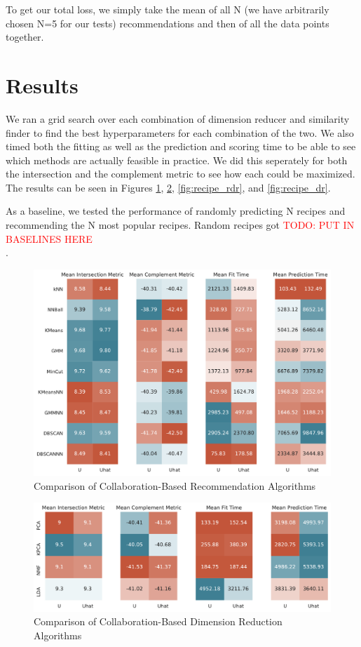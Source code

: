 \documentclass[11pt]{article}
\newcommand\todo[1]{\textcolor{red}{TODO: #1 \\}}
\begin{document}
To get our total loss, we simply take the mean of all N (we have arbitrarily chosen N=5 for our tests) recommendations and then of all the data points together.


\section{Results}

We ran a grid search over each combination of dimension reducer and similarity finder to find the best hyperparameters for each combination of the two. We also timed both the fitting as well as the prediction and scoring time to be able to see which methods are actually feasible in practice. We did this seperately for both the intersection and the complement metric to see how each could be maximized. The results can be seen in Figures \ref{fig:user_rdr}, \ref{fig:user_dr}, \ref{fig:recipe_rdr}, and \ref{fig:recipe_dr}.

As a baseline, we tested the performance of randomly predicting N recipes and recommending the N most popular recipes. Random recipes got \todo{PUT IN BASELINES HERE}.
\begin{figure}[t]
\centering
\includegraphics[width=1\textwidth]{figs/user_rdr.pdf}
\caption{Comparison of Collaboration-Based Recommendation Algorithms}
\label{fig:user_rdr}
\end{figure}

\begin{figure}[t]
\centering
\includegraphics[width=1\textwidth]{figs/user_dr.pdf}
\caption{Comparison of Collaboration-Based Dimension Reduction Algorithms}
\label{fig:user_dr}
\end{figure}
\end{document}

